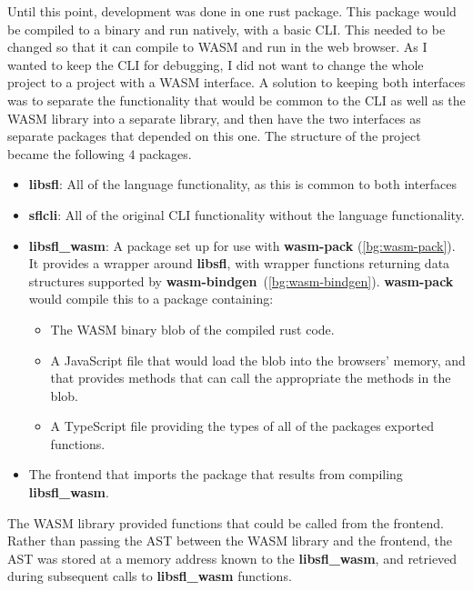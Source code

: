 Until this point, development was done in one rust package. This package would be compiled to a binary and run natively, with a basic \ac{CLI}. This needed to be changed so that it can compile to \ac{WASM} and run in the web browser. As I wanted to keep the \ac{CLI} for debugging, I did not want to change the whole project to a project with a \ac{WASM} interface. A solution to keeping both interfaces was to separate the functionality that would be common to the \ac{CLI} as well as the \ac{WASM} library into a separate library, and then have the two interfaces as separate packages that depended on this one. The structure of the project became the following 4 packages. 

\begin{itemize}
    \item \textbf{libsfl}: All of the language functionality, as this is common to both interfaces
    \item \textbf{sflcli}: All of the original CLI functionality without the language functionality.  
    \item \textbf{libsfl\_wasm}: A package set up for use with \textbf{wasm-pack} (\ref{bg:wasm-pack}). It provides a wrapper around \textbf{libsfl}, with wrapper functions returning data structures supported by \textbf{wasm-bindgen}~(\ref{bg:wasm-bindgen}). \textbf{wasm-pack} would compile this to a package containing:
    \begin{itemize}
        \item The \ac{WASM} binary blob of the compiled rust code.
        \item A JavaScript file that would load the blob into the browsers' memory, and that provides methods that can call the appropriate the methods in the blob.
        \item A TypeScript file providing the types of all of the packages exported functions. 
    \end{itemize}
    \item The frontend that imports the package that results from compiling \textbf{libsfl\_wasm}.
\end{itemize}

\noindent The \ac{WASM} library provided functions that could be called from the frontend. Rather than passing the \ac{AST} between the \ac{WASM} library and the frontend, the \ac{AST} was stored at a memory address known to the \textbf{libsfl\_wasm}, and retrieved during subsequent calls to \textbf{libsfl\_wasm} functions. 

